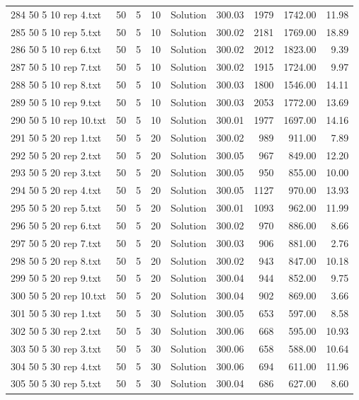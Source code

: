 \begin{longtable}{lrrllrrrr}
284 50 5 10 rep 4.txt & 50 & 5 & 10 & Solution & 300.03 & 1979 & 1742.00 & 11.98\\
285 50 5 10 rep 5.txt & 50 & 5 & 10 & Solution & 300.02 & 2181 & 1769.00 & 18.89\\
286 50 5 10 rep 6.txt & 50 & 5 & 10 & Solution & 300.02 & 2012 & 1823.00 &  9.39\\
287 50 5 10 rep 7.txt & 50 & 5 & 10 & Solution & 300.02 & 1915 & 1724.00 &  9.97\\
288 50 5 10 rep 8.txt & 50 & 5 & 10 & Solution & 300.03 & 1800 & 1546.00 & 14.11\\
289 50 5 10 rep 9.txt & 50 & 5 & 10 & Solution & 300.03 & 2053 & 1772.00 & 13.69\\
290 50 5 10 rep 10.txt & 50 & 5 & 10 & Solution & 300.01 & 1977 & 1697.00 & 14.16\\
291 50 5 20 rep 1.txt & 50 & 5 & 20 & Solution & 300.02 & 989 & 911.00 &  7.89\\
292 50 5 20 rep 2.txt & 50 & 5 & 20 & Solution & 300.05 & 967 & 849.00 & 12.20\\
293 50 5 20 rep 3.txt & 50 & 5 & 20 & Solution & 300.05 & 950 & 855.00 & 10.00\\
294 50 5 20 rep 4.txt & 50 & 5 & 20 & Solution & 300.05 & 1127 & 970.00 & 13.93\\
295 50 5 20 rep 5.txt & 50 & 5 & 20 & Solution & 300.01 & 1093 & 962.00 & 11.99\\
296 50 5 20 rep 6.txt & 50 & 5 & 20 & Solution & 300.02 & 970 & 886.00 &  8.66\\
297 50 5 20 rep 7.txt & 50 & 5 & 20 & Solution & 300.03 & 906 & 881.00 &  2.76\\
298 50 5 20 rep 8.txt & 50 & 5 & 20 & Solution & 300.02 & 943 & 847.00 & 10.18\\
299 50 5 20 rep 9.txt & 50 & 5 & 20 & Solution & 300.04 & 944 & 852.00 &  9.75\\
300 50 5 20 rep 10.txt & 50 & 5 & 20 & Solution & 300.04 & 902 & 869.00 &  3.66\\
301 50 5 30 rep 1.txt & 50 & 5 & 30 & Solution & 300.05 & 653 & 597.00 &  8.58\\
302 50 5 30 rep 2.txt & 50 & 5 & 30 & Solution & 300.06 & 668 & 595.00 & 10.93\\
303 50 5 30 rep 3.txt & 50 & 5 & 30 & Solution & 300.06 & 658 & 588.00 & 10.64\\
304 50 5 30 rep 4.txt & 50 & 5 & 30 & Solution & 300.06 & 694 & 611.00 & 11.96\\
305 50 5 30 rep 5.txt & 50 & 5 & 30 & Solution & 300.04 & 686 & 627.00 &  8.60\\

\end{longtable}
